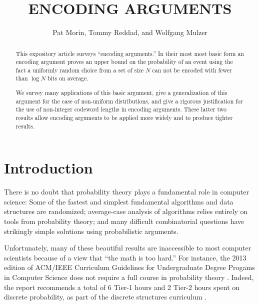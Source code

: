 \documentclass{patmorin}
\title{\MakeUppercase{Encoding Arguments}}
\author{Pat Morin, Tommy Reddad, and Wolfgang Mulzer}
\date{}
\begin{document}
\begin{titlepage}
\maketitle


\begin{abstract}
\setlength{\baselineskip}{15.84pt}
  This expository article surveys ``encoding arguments.'' In their
  most most basic form an encoding argument proves an upper bound on
  the probability of an event using the fact a uniformly random choice
  from a set of size $N$ can not be encoded with fewer than $\log N$
  bits on average.

  We survey many applications of this basic argument, give a
  generalization of this argument for the case of non-uniform
  distributions, and give a rigorous justification for the use of
  non-integer codeword lengths in encoding arguments.  These latter
  two results allow encoding arguments to be applied more widely and to
  produce tighter results.
\end{abstract}


\end{titlepage}
\tableofcontents
\newpage
{}

\section{Introduction}
\setlength{\baselineskip}{15.84pt}
There is no doubt that probability theory plays a fundamental role
in computer science: Some of the fastest and simplest fundamental
algorithms and data structures are randomized; average-case analysis of
algorithms relies entirely on tools from probability theory; and many
difficult combinatorial questions have strikingly simple solutions using
probabilistic arguments.

Unfortunately, many of these beautiful results are inaccessible
to most computer scientists because of a view that ``the math
is too hard.''  For instance, the 2013 edition of ACM/IEEE
Curriculum Guidelines for Undergraduate Degree Progams in Computer
Science does not require a full course in probability theory
\cite[Page~50]{computing-curricula:computer}. Indeed, the report
recommends a total of 6 Tier-1 hours and 2 Tier-2 hours spent on
discrete probability, as part of the discrete structures curriculum
\cite[Page~77]{computing-curricula:computer}.
\end{document}
